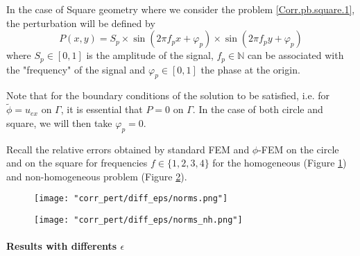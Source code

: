 In the case of Square geometry where we consider the problem \ref{Corr.pb.square.1}, the perturbation will be defined by
\begin{equation*}
	P(x,y)=S_p\times\sin\left(2\pi f_px+\varphi_p\right)\times\sin\left(2\pi f_py+\varphi_p\right)
\end{equation*}
where $S_p\in[0,1]$ is the amplitude of the signal, $f_p\in\mathbb{N}$ can be associated with the "frequency" of the signal and $\varphi_p\in[0,1]$ the phase at the origin.

\begin{Rem}
	Note that for the boundary conditions of the solution to be satisfied, i.e. for $\tilde{\phi}=u_{ex}$ on $\Gamma$, it is essential that $P=0$ on $\Gamma$. In the case of both circle and square, we will then take $\varphi_p=0$.
\end{Rem}

Recall the relative errors obtained by standard FEM and $\phi$-FEM on the circle and on the square for frequencies $f\in\{1,2,3,4\}$ for the homogeneous  (Figure \ref{norms}) and non-homogeneous problem  (Figure \ref{norms_nh}).

\begin{minipage}{0.48\linewidth}
	\begin{figure}[H]
		\centering
		\texttt{[image: "corr\_pert/diff\_eps/norms.png"]}
		\label{norms}
	\end{figure} 
\end{minipage}
\begin{minipage}{0.48\linewidth}
	\begin{figure}[H]
		\centering
		\texttt{[image: "corr\_pert/diff\_eps/norms\_nh.png"]}
		\label{norms_nh}
	\end{figure} 
\end{minipage}


\paragraph{Results with differents $\epsilon$} \label{Corr.results.disturbed.eps} 


